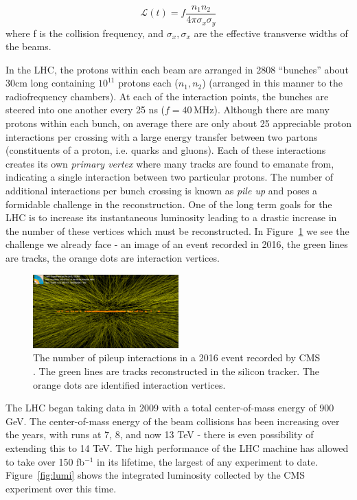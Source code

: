 \begin{equation}
\label{eq:lumi}
\mathcal{L}(t) = f \frac{n_{1} n_{2}}  { 4 \pi \sigma_{x} \sigma_{y}}
\end{equation}
where f is the collision frequency, and $\sigma_{x}, \sigma_{x}$ are the effective transverse widths of the beams.

In the LHC, the protons within each beam are arranged in 2808 ``bunches'' about 30cm long containing $10^{11}$ protons each ($n_{1}, n_{2}$) (arranged in this manner to the radiofrequency chambers). At each of the interaction points, the bunches are steered into one another every 25 ns ($f=40\,\textrm{MHz}$). Although there are many protons within each bunch, on average there are only about 25 appreciable proton interactions per crossing with a large energy transfer between two partons (constituents of a proton, i.e. quarks and gluons). Each of these interactions creates its own \textit{primary vertex} where many tracks are found to emanate from, indicating a single interaction between two particular protons. The number of additional interactions per bunch crossing is known as \textit{pile up} and poses a formidable challenge in the reconstruction. One of the long term goals for the LHC is to increase its instantaneous luminosity leading to a drastic increase in the number of these vertices which must be reconstructed. In Figure~\ref{fig:pu} we see  the challenge we already face - an image of an event recorded in 2016, the green lines are tracks, the orange dots are interaction vertices.

\begin{figure}
\centering
\includegraphics[width=0.5\textwidth]{figs/highpileup0_4.png}
\caption[The number of pileup interactions in a 2016 event recorded by CMS.]{The number of pileup interactions in a 2016 event recorded by CMS \cite{pu}. The green lines are tracks reconstructed in the silicon tracker. The orange dots are identified interaction vertices.}
\label{fig:pu}
\end{figure}

The LHC began taking data in 2009 with a total center-of-mass energy of 900 GeV. The center-of-mass energy of the beam collisions has been increasing over the years, with runs at 7, 8, and now 13 TeV - there is even possibility of extending this to 14 TeV. The high performance of the LHC machine has allowed to take over 150 fb$^{-1}$ in its lifetime, the largest of any experiment to date. Figure~\ref{fig:lumi} shows the integrated luminosity collected by the CMS experiment over this time.

